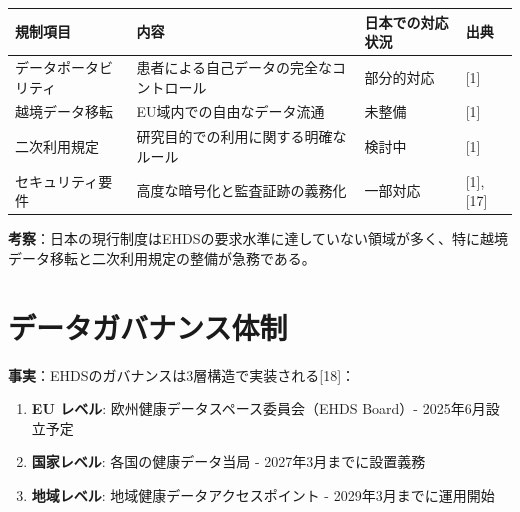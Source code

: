 \documentclass[
  a4paper,
  a4paper,
  11pt]{ltjsbook}
\providecommand{\tightlist}{%
  \setlength{\itemsep}{0pt}\setlength{\parskip}{0pt}}
\begin{document}
\begin{longtable}[]{@{}
  >{\raggedright\arraybackslash}p{}
  >{\raggedright\arraybackslash}p{}
  >{\raggedright\arraybackslash}p{}
  >{\raggedright\arraybackslash}p{}@{}}
\toprule\noalign{}
\begin{minipage}[b]{\linewidth}\raggedright
規制項目
\end{minipage} & \begin{minipage}[b]{\linewidth}\raggedright
内容
\end{minipage} & \begin{minipage}[b]{\linewidth}\raggedright
日本での対応状況
\end{minipage} & \begin{minipage}[b]{\linewidth}\raggedright
出典
\end{minipage} \\
\midrule\noalign{}
\endhead
\bottomrule\noalign{}
\endlastfoot
データポータビリティ & 患者による自己データの完全なコントロール &
部分的対応 & {[}1{]} \\
越境データ移転 & EU域内での自由なデータ流通 & 未整備 & {[}1{]} \\
二次利用規定 & 研究目的での利用に関する明確なルール & 検討中 &
{[}1{]} \\
セキュリティ要件 & 高度な暗号化と監査証跡の義務化 & 一部対応 & {[}1{]},
{[}17{]} \\
\end{longtable}

\textbf{考察}：日本の現行制度はEHDSの要求水準に達していない領域が多く、特に越境データ移転と二次利用規定の整備が急務である。

\section{データガバナンス体制}\label{ux30c7ux30fcux30bfux30acux30d0ux30caux30f3ux30b9ux4f53ux5236}

\textbf{事実}：EHDSのガバナンスは3層構造で実装される{[}18{]}：

\begin{enumerate}
\def\labelenumi{\arabic{enumi}.}
\tightlist
\item
  \textbf{EU レベル}: 欧州健康データスペース委員会（EHDS Board）-
  2025年6月設立予定
\item
  \textbf{国家レベル}: 各国の健康データ当局 - 2027年3月までに設置義務
\item
  \textbf{地域レベル}: 地域健康データアクセスポイント -
  2029年3月までに運用開始
\end{enumerate}
\end{document}
